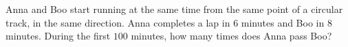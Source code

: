 Anna and Boo start running at the same time from the same point of a circular track, in the same direction. Anna completes a lap in $6$ minutes and Boo in $8$ minutes. During the first $100$ minutes, how many times does Anna pass Boo?
